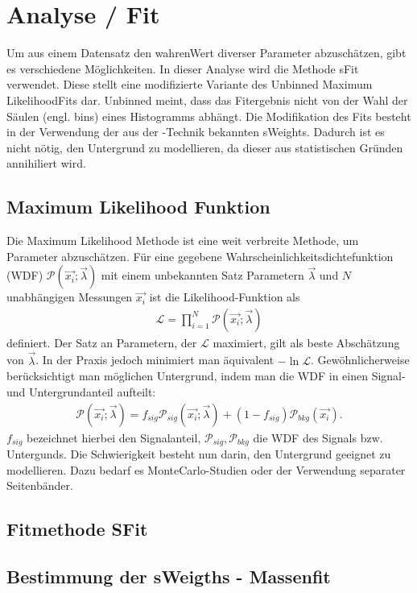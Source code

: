 \chapter{Analyse / Fit}
Um aus einem Datensatz den \glqq wahren\grqq Wert diverser Parameter abzuschätzen, gibt es verschiedene Möglichkeiten. In dieser Analyse wird die Methode sFit verwendet. Diese stellt eine modifizierte Variante des \glqq Unbinned Maximum Likelihood\grqq Fits dar. Unbinned meint, dass das Fitergebnis nicht von der Wahl der Säulen (engl. bins) eines Histogramms abhängt. Die Modifikation des Fits besteht in der Verwendung der aus der \SPlot-Technik bekannten sWeights. Dadurch ist es nicht nötig, den Untergrund zu modellieren, da dieser aus statistischen Gründen annihiliert wird.

\section{Maximum Likelihood Funktion}
Die Maximum Likelihood Methode ist eine weit verbreite Methode, um Parameter abzuschätzen. Für eine gegebene Wahrscheinlichkeitsdichtefunktion (WDF) $\mathcal{P}(\vec{x_i};\vec{\lambda})$ mit einem unbekannten Satz Parametern $\vec{\lambda}$ und $N$ unabhängigen Messungen $\vec{x_i}$ ist die Likelihood-Funktion als
\begin{align}
\mathcal{L} = \prod_{i=1}^N \mathcal{P}(\vec{x_i};\vec{\lambda})
\end{align}
definiert. Der Satz an Parametern, der $\mathcal{L}$ maximiert, gilt als beste Abschätzung von $\vec{\lambda}$. In der Praxis jedoch minimiert man äquivalent $-\ln\mathcal{L}$. Gewöhnlicherweise berücksichtigt man möglichen Untergrund, indem man die WDF in einen Signal- und Untergrundanteil aufteilt:
\begin{align}
\mathcal{P}(\vec{x_i};\vec{\lambda}) = f_{sig}\mathcal{P}_{sig}(\vec{x_i};\vec{\lambda}) + (1-f_{sig})\mathcal{P}_{bkg}(\vec{x_i}).
\end{align}
$f_{sig}$ bezeichnet hierbei den Signalanteil, $\mathcal{P}_{sig}, \mathcal{P}_{bkg}$ die WDF des Signals bzw. Untergunds. Die Schwierigkeit besteht nun darin, den Untergrund geeignet zu modellieren. Dazu bedarf es MonteCarlo-Studien oder der Verwendung separater Seitenbänder. \cite{sfit}
\section{Fitmethode SFit}
\section{Bestimmung der sWeigths - Massenfit}
